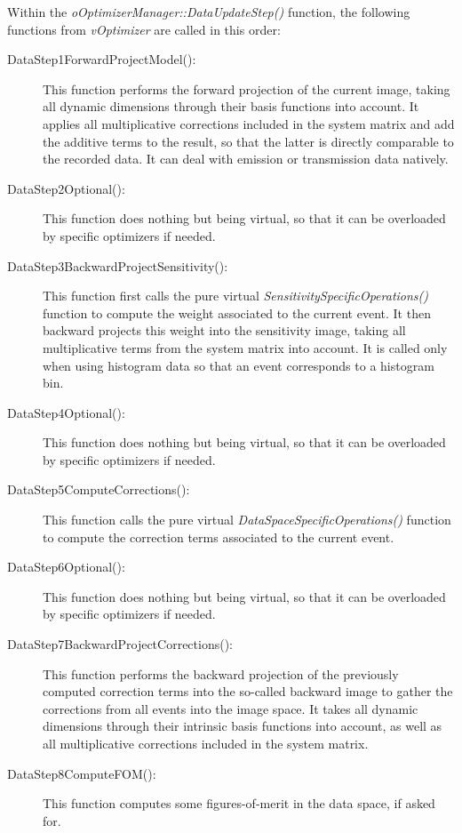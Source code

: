 \documentclass[a4paper, 11pt]{article}
\begin{document}
Within the \textit{oOptimizerManager::DataUpdateStep()} function, the following functions from \textit{vOptimizer} are called in this order:
\begin{description}
  \item[DataStep1ForwardProjectModel():]
This function performs the forward projection of the current image, taking all dynamic dimensions through their basis functions into account.
It applies all multiplicative corrections included in the system matrix and add the additive terms to the result, so that the latter is directly comparable to the recorded data.
It can deal with emission or transmission data natively.
  \item[DataStep2Optional():]
This function does nothing but being virtual, so that it can be overloaded by specific optimizers if needed.
  \item[DataStep3BackwardProjectSensitivity():]
This function first calls the pure virtual \textit{SensitivitySpecificOperations()} function to compute the weight associated to the current event.
It then backward projects this weight into the sensitivity image, taking all multiplicative terms from the system matrix into account.
It is called only when using histogram data so that an event corresponds to a histogram bin.
  \item[DataStep4Optional():]
This function does nothing but being virtual, so that it can be overloaded by specific optimizers if needed.
  \item[DataStep5ComputeCorrections():]
This function calls the pure virtual \textit{DataSpaceSpecificOperations()} function to compute the correction terms associated to the current event.
  \item[DataStep6Optional():]
This function does nothing but being virtual, so that it can be overloaded by specific optimizers if needed.
  \item[DataStep7BackwardProjectCorrections():]
This function performs the backward projection of the previously computed correction terms into the so-called backward image to gather the corrections from all events into the image space.
It takes all dynamic dimensions through their intrinsic basis functions into account, as well as all multiplicative corrections included in the system matrix.
  \item[DataStep8ComputeFOM():]
This function computes some figures-of-merit in the data space, if asked for.
\end{description}

\bigskip
\end{document}
